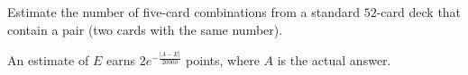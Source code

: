 Estimate the number of five-card combinations from a standard $52$-card deck that contain a pair (two cards with the same number).

An estimate of $E$ earns $2e^{-\frac{\left|A-E\right|}{20000}}$ points, where $A$ is the actual answer.